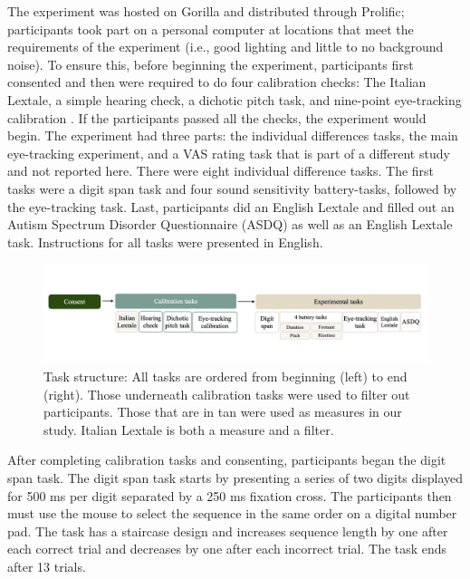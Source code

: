 The experiment was hosted on Gorilla and distributed through Prolific; participants took part on a personal computer at locations that meet the requirements of the experiment (i.e., good lighting and little to no background noise). To ensure this, before beginning the experiment, participants first consented and then were required to do four calibration checks: The Italian Lextale, a simple hearing check, a dichotic pitch task, and nine-point eye-tracking calibration \citep{bramlett_wiener_24-AOW}. If the participants passed all the checks, the experiment would begin. The experiment had three parts: the individual differences tasks, the main eye-tracking experiment, and a VAS rating task that is part of a different study and not reported here. There were eight individual difference tasks. The first tasks were a digit span task and four sound sensitivity battery-tasks, followed by the eye-tracking task. Last, participants did an English Lextale and filled out an Autism Spectrum Disorder Questionnaire (ASDQ) as well as an English Lextale task. Instructions for all tasks were presented in English.



\begin{figure}[H]
  \centering
  \includegraphics[width=1\linewidth]{visuals/task_strucutre.jpg} %
  \caption{Task structure: All tasks are ordered from beginning (left) to end (right). Those underneath calibration tasks were used to filter out participants. Those that are in tan were used as measures in our study. Italian Lextale is both a measure and a filter.}
  \label{fig:task_structure}
\end{figure}

After completing calibration tasks and consenting, participants began the digit span task. The digit span task starts by presenting a series of two digits displayed for 500 ms per digit separated by a 250 ms fixation cross. The participants then must use the mouse to select the sequence in the same order on a digital number pad. The task has a staircase design and increases sequence length by one after each correct trial and decreases by one after each incorrect trial. The task ends after 13 trials. 

